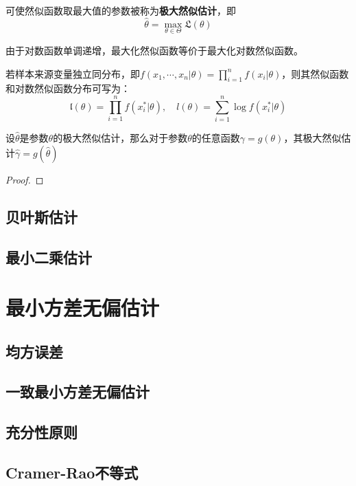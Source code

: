 \begin{definition}[极大然似估计]
    可使然似函数取最大值的参数被称为\textbf{极大然似估计}，即
    \[ \hat{\theta}=\max_{\theta \in \Theta}\mathfrak{L}(\theta) \]
\end{definition}
\begin{remark}
    由于对数函数单调递增，最大化然似函数等价于最大化对数然似函数。
\end{remark}

若样本来源变量独立同分布，即$f(x_1,\cdots ,x_n|\theta)=\prod_{i=1}^nf(x_i|\theta)$，则其然似函数和对数然似函数分布可写为：
\[ \mathfrak{l}(\theta) = \prod_{i=1}^nf(x_i^*|\theta), \quad l(\theta) = \sum_{i=1}^n \log f(x_i^*|\theta) \]

\begin{proposition}[极大然似估计的不变性]
    设$\hat{\theta}$是参数$\theta$的极大然似估计，那么对于参数$\theta$的任意函数$\gamma = g(\theta)$，其极大然似估计$\hat{\gamma}=g(\hat{\theta})$
\end{proposition}
\begin{proof}
\end{proof}

\subsection{贝叶斯估计}

\subsection{最小二乘估计}

\section{最小方差无偏估计}

\subsection{均方误差}

\subsection{一致最小方差无偏估计}

\subsection{充分性原则}

\subsection{Cramer-Rao不等式}

